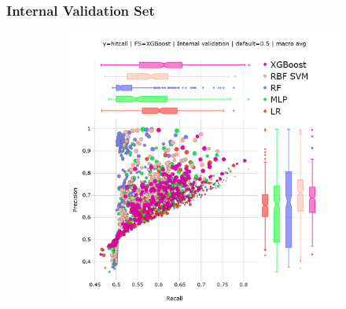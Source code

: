 \newpage


\subsubsection{Internal Validation Set}\label{sec:internal_validation_set}

\begin{figure}[h]
  \centering
  \begin{subfigure}[b]{0.495\textwidth}
      \centering
      \includegraphics[width=\textwidth]{generated_results/hitcall_classification_Feature_Selection_XGBClassifier_val_default_macro_avg.png}
      \caption{}
  \label{fig:hitcall_classification_Feature_Selection_XGBClassifier_val_default_macro_avg}
  \end{subfigure}
  \hfill
  \begin{subfigure}[b]{0.495\textwidth}
      \centering

\end{subfigure}
\end{figure}
